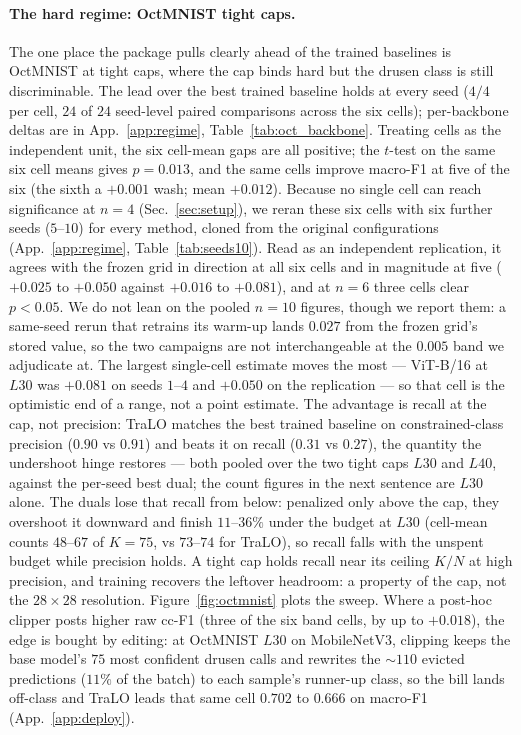 \documentclass[10pt]{article}
\begin{document}
\paragraph{The hard regime: OctMNIST tight caps.}
The one place the package pulls clearly ahead of the trained baselines is
OctMNIST at tight caps, where the cap binds hard but the drusen class is
still discriminable. {The lead over the best
trained baseline holds at every seed ($4/4$ per cell, $24$ of $24$ seed-level
paired comparisons across the six cells); per-backbone deltas are in }{App.~\ref{app:regime}, }Table~\ref{tab:oct_backbone}.
Treating cells as the independent unit, the six cell-mean gaps are all
positive; the $t$-test on the same six cell means gives $p{=}0.013$, and
the same cells improve macro-F1 at five of the six (the sixth a $+0.001$
wash; mean $+0.012$).
{{Because no single cell can reach significance at $n{=}4$
(Sec.~\ref{sec:setup}), we reran} these six cells with six further seeds ($5$--$10$) for every method,
cloned from the original configurations ({App.~\ref{app:regime}, }Table~\ref{tab:seeds10}). Read as an
independent replication, it agrees with the frozen grid in direction at all six
cells and in magnitude at five ($+0.025$ to $+0.050$ against $+0.016$ to
$+0.081$), and at $n{=}6$ three cells clear $p<0.05$. We do not
lean on the pooled $n{=}10$ figures, though we report them: a same-seed rerun
that retrains its warm-up lands $0.027$ from the frozen grid's stored value, so the two campaigns are not interchangeable at the $0.005$
band we adjudicate at. The largest single-cell estimate moves the most --- ViT-B/16 at $L30$
was $+0.081$ on seeds $1$--$4$ and $+0.050$ on the replication --- {so that cell is the optimistic end of a range, not a point
estimate}.} The advantage is recall at the cap, not precision:
TraLO matches the best trained baseline on constrained-class precision
($0.90$ vs $0.91$) and beats it on recall ($0.31$ vs $0.27$), the quantity
the undershoot hinge restores{ --- both pooled over the two tight
caps $L30$ and $L40$, against the per-seed best dual; the count figures in the
next sentence are $L30$ alone}. The duals lose that recall from below:
penalized only above the cap, they overshoot it downward and finish
$11$--$36\%$ under the budget at $L30$ (cell-mean counts $48$--$67$ of
$K{=}75$, vs $73$--$74$ for TraLO), so recall falls with the unspent
budget while precision holds. A tight cap holds recall near its ceiling
$K/N$ at high precision, and training recovers the leftover headroom: a
property of the cap, not the $28{\times}28$ resolution. Figure~\ref{fig:octmnist}%
{ plots the sweep.} Where a
post-hoc clipper posts higher raw cc-F1 (three of the six band cells, by
up to $+0.018$), the edge is bought by editing: at OctMNIST $L30$ on
MobileNetV3, clipping keeps the base model's $75$ most confident drusen
calls and rewrites the ${\sim}110$ evicted predictions ($11\%$ of the
batch) to each sample's runner-up class, so the bill lands off-class and
TraLO leads that same cell $0.702$ to $0.666$ on macro-F1
(App.~\ref{app:deploy}).
\end{document}
